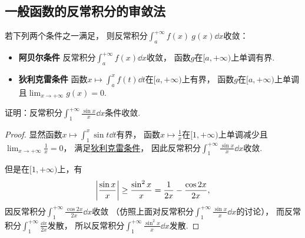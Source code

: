 \subsection{一般函数的反常积分的审敛法}
\begin{theorem}\label{theorem:反常积分.阿贝尔--狄利克雷审敛法}
若下列两个条件之一满足，
则反常积分\(\int_a^{+\infty} f(x) ~ g(x) \dd{x}\)收敛：\begin{itemize}
	\item {\bf 阿贝尔条件}
	反常积分\(\int_a^{+\infty} f(x) \dd{x}\)收敛，
	函数\(g\)在\([a,+\infty)\)上单调有界.

	\item {\bf 狄利克雷条件}
	函数\(x \mapsto \int_a^x f(t) \dd{t}\)在\([a,+\infty)\)上有界，
	函数\(g\)在\([a,+\infty)\)上单调且\(\lim_{x\to+\infty} g(x) = 0\).
\end{itemize}
\end{theorem}

\begin{example}
证明：反常积分\(\int_1^{+\infty} \frac{\sin x}{x} \dd{x}\)条件收敛.
\begin{proof}
显然函数\(x \mapsto \int_1^x \sin t \dd{t}\)有界，
函数\(x \mapsto \frac1x\)在\([1,+\infty)\)上单调减少且\(\lim_{x\to+\infty} \frac1x = 0\)，
满足\hyperref[theorem:反常积分.阿贝尔--狄利克雷审敛法]{狄利克雷条件}，
因此反常积分\(\int_1^{+\infty} \frac{\sin x}{x} \dd{x}\)收敛.

但是在\([1,+\infty)\)上，有\[
	\abs{\frac{\sin x}{x}}
	\geq \frac{\sin^2x}{x}
	= \frac1{2x} - \frac{\cos2x}{2x},
\]
因反常积分\(\int_1^{+\infty} \frac{\cos2x}{2x} \dd{x}\)收敛
（仿照上面对反常积分\(\int_1^{+\infty} \frac{\sin x}{x} \dd{x}\)的讨论），
而反常积分\(\int_1^{+\infty} \frac{\dd{x}}{2x}\)发散，
所以反常积分\(\int_1^{+\infty} \frac{\sin^2x}{x} \dd{x}\)发散.
\end{proof}
\end{example}
